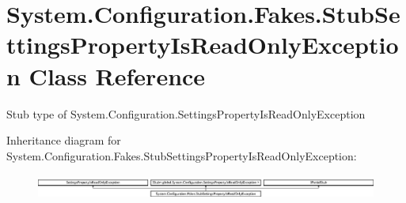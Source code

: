 \hypertarget{class_system_1_1_configuration_1_1_fakes_1_1_stub_settings_property_is_read_only_exception}{\section{System.\-Configuration.\-Fakes.\-Stub\-Settings\-Property\-Is\-Read\-Only\-Exception Class Reference}
\label{class_system_1_1_configuration_1_1_fakes_1_1_stub_settings_property_is_read_only_exception}
}


Stub type of System.\-Configuration.\-Settings\-Property\-Is\-Read\-Only\-Exception 


Inheritance diagram for System.\-Configuration.\-Fakes.\-Stub\-Settings\-Property\-Is\-Read\-Only\-Exception\-:\begin{figure}[H]
\begin{center}
\leavevmode
\includegraphics[height=0.835198cm]{class_system_1_1_configuration_1_1_fakes_1_1_stub_settings_property_is_read_only_exception}
\end{center}
\end{figure}
